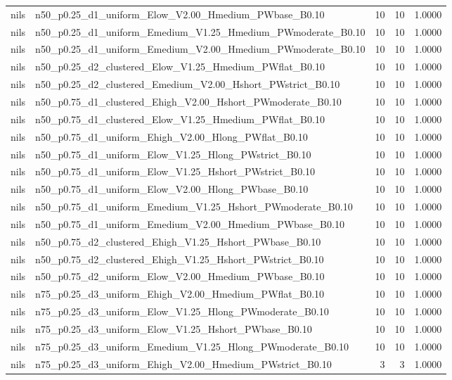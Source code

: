 \begin{tabular}{llrrr}
nils & n50_p0.25_d1_uniform_Elow_V2.00_Hmedium_PWbase_B0.10 & 10 & 10 & 1.0000 \\
nils & n50_p0.25_d1_uniform_Emedium_V1.25_Hmedium_PWmoderate_B0.10 & 10 & 10 & 1.0000 \\
nils & n50_p0.25_d1_uniform_Emedium_V2.00_Hmedium_PWmoderate_B0.10 & 10 & 10 & 1.0000 \\
nils & n50_p0.25_d2_clustered_Elow_V1.25_Hmedium_PWflat_B0.10 & 10 & 10 & 1.0000 \\
nils & n50_p0.25_d2_clustered_Emedium_V2.00_Hshort_PWstrict_B0.10 & 10 & 10 & 1.0000 \\
nils & n50_p0.75_d1_clustered_Ehigh_V2.00_Hshort_PWmoderate_B0.10 & 10 & 10 & 1.0000 \\
nils & n50_p0.75_d1_clustered_Elow_V1.25_Hmedium_PWflat_B0.10 & 10 & 10 & 1.0000 \\
nils & n50_p0.75_d1_uniform_Ehigh_V2.00_Hlong_PWflat_B0.10 & 10 & 10 & 1.0000 \\
nils & n50_p0.75_d1_uniform_Elow_V1.25_Hlong_PWstrict_B0.10 & 10 & 10 & 1.0000 \\
nils & n50_p0.75_d1_uniform_Elow_V1.25_Hshort_PWstrict_B0.10 & 10 & 10 & 1.0000 \\
nils & n50_p0.75_d1_uniform_Elow_V2.00_Hlong_PWbase_B0.10 & 10 & 10 & 1.0000 \\
nils & n50_p0.75_d1_uniform_Emedium_V1.25_Hshort_PWmoderate_B0.10 & 10 & 10 & 1.0000 \\
nils & n50_p0.75_d1_uniform_Emedium_V2.00_Hmedium_PWbase_B0.10 & 10 & 10 & 1.0000 \\
nils & n50_p0.75_d2_clustered_Ehigh_V1.25_Hshort_PWbase_B0.10 & 10 & 10 & 1.0000 \\
nils & n50_p0.75_d2_clustered_Ehigh_V1.25_Hshort_PWstrict_B0.10 & 10 & 10 & 1.0000 \\
nils & n50_p0.75_d2_uniform_Elow_V2.00_Hmedium_PWbase_B0.10 & 10 & 10 & 1.0000 \\
nils & n75_p0.25_d3_uniform_Ehigh_V2.00_Hmedium_PWflat_B0.10 & 10 & 10 & 1.0000 \\
nils & n75_p0.25_d3_uniform_Elow_V1.25_Hlong_PWmoderate_B0.10 & 10 & 10 & 1.0000 \\
nils & n75_p0.25_d3_uniform_Elow_V1.25_Hshort_PWbase_B0.10 & 10 & 10 & 1.0000 \\
nils & n75_p0.25_d3_uniform_Emedium_V1.25_Hlong_PWmoderate_B0.10 & 10 & 10 & 1.0000 \\
nils & n75_p0.25_d3_uniform_Ehigh_V2.00_Hmedium_PWstrict_B0.10 & 3 & 3 & 1.0000 \\

\end{tabular}
